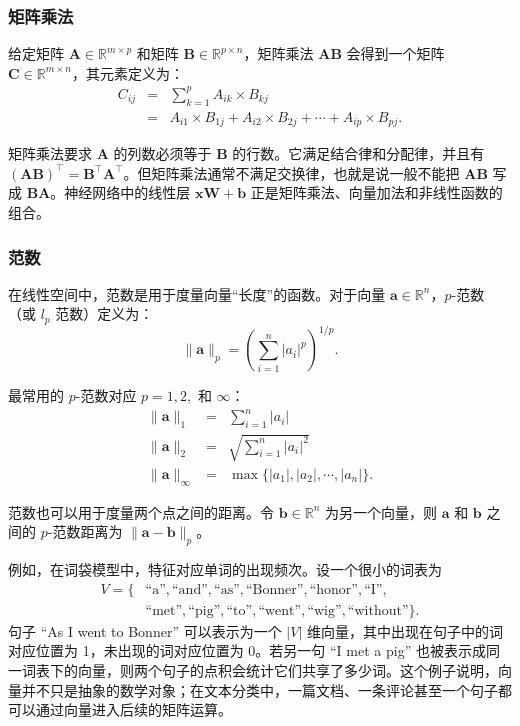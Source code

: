 \subsubsection{矩阵乘法}

\noindent 给定矩阵 $\mathbf{A} \in \mathbb{R}^{m \times p}$ 和矩阵 $\mathbf{B} \in \mathbb{R}^{p \times n}$，矩阵乘法 $\mathbf{A}\mathbf{B}$ 会得到一个矩阵 $\mathbf{C} \in \mathbb{R}^{m \times n}$，其元素定义为：
\begin{eqnarray}
C_{ij} & = & \sum_{k=1}^{p} A_{ik} \times B_{kj} \nonumber \\
       & = & A_{i1} \times B_{1j} + A_{i2} \times B_{2j}+ \cdots + A_{ip} \times B_{pj}.
\end{eqnarray}

矩阵乘法要求 $\mathbf{A}$ 的列数必须等于 $\mathbf{B}$ 的行数。它满足结合律和分配律，并且有 $(\mathbf{A}\mathbf{B})^\top=\mathbf{B}^\top\mathbf{A}^\top$。但矩阵乘法通常不满足交换律，也就是说一般不能把 $\mathbf{A}\mathbf{B}$ 写成 $\mathbf{B}\mathbf{A}$。神经网络中的线性层 $\mathbf{x}\mathbf{W}+\mathbf{b}$ 正是矩阵乘法、向量加法和非线性函数的组合。

\subsubsection{范数}
\label{sec:norm}

\noindent 在线性空间中，范数是用于度量向量“长度”的函数。对于向量 $\mathbf{a} \in \mathbb{R}^n$，$p$-范数（或 $l_p$ 范数）定义为：
\begin{equation}
\|\mathbf{a}\|_p = \left( \sum_{i=1}^{n} |a_i|^p \right)^{1/p}.
\end{equation}

最常用的 $p$-范数对应 $p=1, 2,$ 和 $\infty$：
\begin{eqnarray}
\|\mathbf{a}\|_1 & = & \sum_{i=1}^{n} |a_i| \\
\|\mathbf{a}\|_2 & = & \sqrt{\sum_{i=1}^{n} |a_i|^2} \\
\|\mathbf{a}\|_{\infty} & = & \max\{|a_1|,|a_2|,\cdots,|a_n|\}.
\end{eqnarray}

范数也可以用于度量两个点之间的距离。令 $\mathbf{b} \in \mathbb{R}^n$ 为另一个向量，则 $\mathbf{a}$ 和 $\mathbf{b}$ 之间的 $p$-范数距离为 $\|\mathbf{a} - \mathbf{b}\|_p$。

例如，在词袋模型中，特征对应单词的出现频次。设一个很小的词表为
\[
\begin{aligned}
V=\{&\text{``a''},\text{``and''},\text{``as''},\text{``Bonner''},
\text{``honor''},\text{``I''},\\
&\text{``met''},\text{``pig''},\text{``to''},\text{``went''},
\text{``wig''},\text{``without''}\}.
\end{aligned}
\]
句子 ``As I went to Bonner'' 可以表示为一个 $|V|$ 维向量，其中出现在句子中的词对应位置为 1，未出现的词对应位置为 0。若另一句 ``I met a pig'' 也被表示成同一词表下的向量，则两个句子的点积会统计它们共享了多少词。这个例子说明，向量并不只是抽象的数学对象；在文本分类中，一篇文档、一条评论甚至一个句子都可以通过向量进入后续的矩阵运算。
